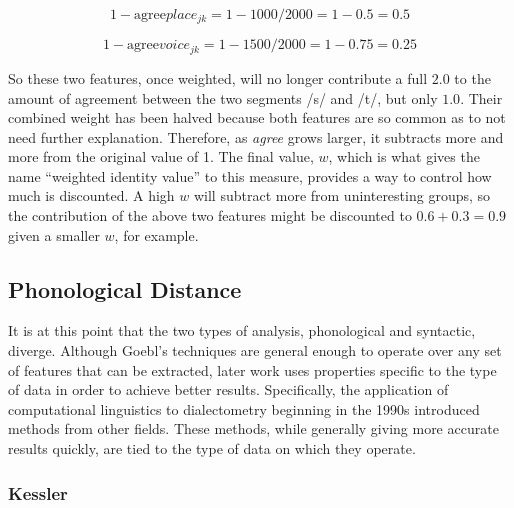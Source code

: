 \documentclass[11pt]{article}
\begin{document}
\begin{equation}
  1 - \textrm{agree}place_{jk} = 1 - 1000/2000 = 1 - 0.5 = 0.5
  \label{wiv-place}
  \end{equation}

\begin{equation}
  1 - \textrm{agree}voice_{jk} = 1 - 1500/2000 = 1 - 0.75 = 0.25
  \label{wiv-voice}
\end{equation}

So these two features, once weighted, will no longer contribute a full
$2.0$ to the amount of agreement between the two segments /s/ and /t/,
but only $1.0$. Their combined weight has been halved because both
features are so common as to not need further explanation.
Therefore, as \textit{agree} grows larger, it subtracts more and more
from the original value of 1.
The final value, $w$, which is what gives the name ``weighted identity
value'' to this measure, provides a way to control how much is
discounted. A high $w$ will subtract more from uninteresting groups,
so the contribution of the above two features might be discounted to
$0.6 + 0.3 = 0.9$ given a smaller $w$, for example.



\subsection{Phonological Distance}

It is at this point that the two types of analysis, phonological and
syntactic, diverge. Although Goebl's techniques are general enough to
operate over any set of features that can be extracted, later work
uses properties specific to the type of data in order to achieve
better results. Specifically, the application of computational
linguistics to dialectometry beginning in the 1990s introduced
methods from other fields. These methods, while generally giving more
accurate results quickly, are tied to the type of data on which they
operate.

\subsubsection{Kessler}
\end{document}
